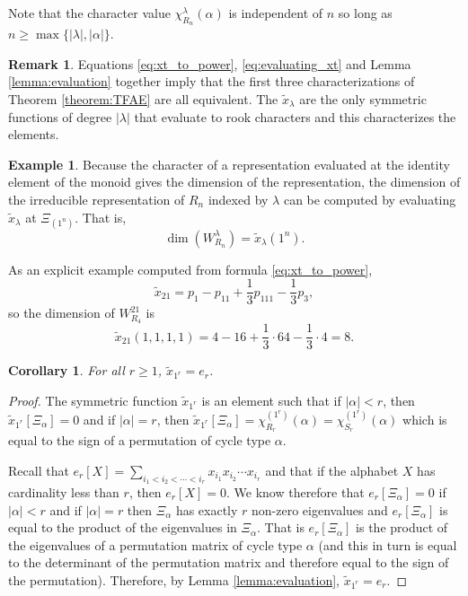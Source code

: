 \documentclass{amsart}
\newtheorem{corollary}[lemma]{Corollary}
\theoremstyle{definition}
\newtheorem{example}[lemma]{Example}
\newtheorem{remark}[lemma]{Remark}
\newcommand{\xt}{\tilde x}
\begin{document}
Note that the character value $\chi^\lambda_{R_n}(\alpha)$ is
independent of $n$ so long as $n\geq\max\{|\lambda|,|\alpha|\}$.

\begin{remark}
Equations \eqref{eq:xt_to_power}, \eqref{eq:evaluating_xt}
and Lemma \ref{lemma:evaluation} together
imply that the first three characterizations
of Theorem \ref{theorem:TFAE} are all equivalent.
The $\xt_\lambda$ are the only symmetric functions of
degree $|\lambda|$ that evaluate to rook characters
and this characterizes the elements.
\end{remark}

\begin{example}\label{ex:xt_to_power}
Because the character of a representation evaluated at the identity element of the monoid gives
the dimension of the representation, the dimension of the irreducible representation of $R_n$
indexed by $\lambda$ can be computed by evaluating $\xt_\lambda$ at $\Xi_{(1^n)}$. That is,
\[\dim(W_{R_n}^\lambda)=\xt_\lambda(1^n).\]

As an explicit example computed from formula \eqref{eq:xt_to_power},
\[\xt_{21}=p_{1}-p_{11}+\frac13p_{111}-\frac13p_{3},\]
so the dimension of $W_{R_4}^{21}$ is \[\xt_{21}(1,1,1,1)=4-16+\frac{1}{3}\cdot64-\frac{1}{3}\cdot 4=8.\]
\end{example}

\begin{corollary}\label{corollary:xtr_equals_er}
For all $r \geq 1$, $\xt_{1^r} = e_r$.
\end{corollary}

\begin{proof}
The symmetric function $\xt_{1^r}$ is an element
such that if $|\alpha|<r$, then $\xt_{1^r}[\Xi_\alpha]=0$ and
if $|\alpha|=r$, then $\xt_{1^r}[\Xi_\alpha] = \chi^{(1^r)}_{R_r}(\alpha)
= \chi^{(1^r)}_{S_r}(\alpha)$ which is equal to the sign of
a permutation of cycle type $\alpha$.

Recall \cite[p. 19]{Macdonald}
that $e_r[X] = \sum_{i_1 < i_2 < \cdots < i_r} x_{i_1} x_{i_2} \cdots x_{i_r}$
and that if the alphabet $X$ has cardinality less than $r$, then $e_r[X]=0$.
We know therefore that $e_r[\Xi_\alpha]=0$ if $|\alpha|<r$ and if $|\alpha|=r$ then
$\Xi_\alpha$ has exactly $r$ non-zero eigenvalues and
$e_r[\Xi_\alpha]$ is equal to the product of the eigenvalues in $\Xi_\alpha$.
That is $e_r[\Xi_\alpha]$ is the product of the eigenvalues
of a permutation matrix of cycle type $\alpha$ (and this in turn is equal to the
determinant of the permutation matrix and therefore equal to the sign of
the permutation).  Therefore, by Lemma \ref{lemma:evaluation}, $\xt_{1^r}=e_r$.
\end{proof}
\end{document}
